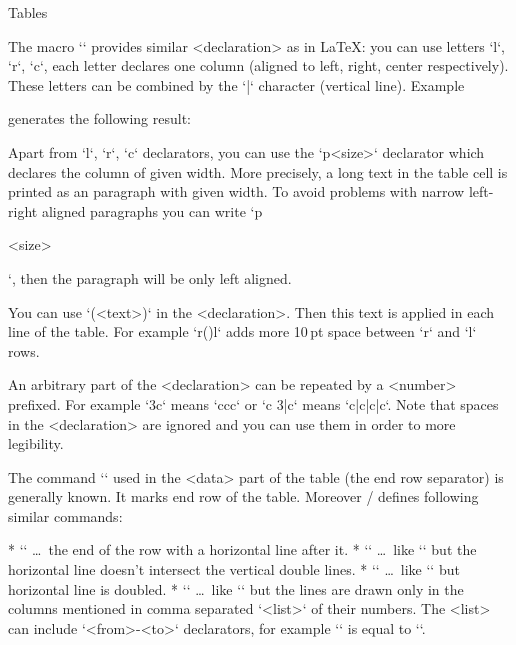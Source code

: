 \secc Tables

The macro `` provides similar <declaration>
as in \LaTeX: you can use letters `l`, `r`, `c`, each letter declares 
one column (aligned to left, right, center respectively). 
These letters can be combined by the `|` character (vertical line). Example

\begtt
{}
\endtt
%
generates the following result:

\bigskip
\hfil{}
\bigskip

Apart from `l`, `r`, `c` declarators, you can use the `p{<size>}` declarator
which declares the column of given width. More precisely, a long text in
the table cell is printed as an paragraph with given width.
To avoid problems with narrow left-right aligned paragraphs you can write
`p{<size>\raggedright}`, then the paragraph will be only left aligned.

You can use `(<text>)` in the <declaration>. Then this text is applied in
each line of the table. For example `r(\kern10pt)l` adds more 10\,pt space
between `r` and `l` rows. 

An arbitrary part of the <declaration> can be repeated by a <number>
prefixed. For example `3c` means `ccc` or `c 3{|c}` means
`c|c|c|c`. Note that spaces in the <declaration> are ignored and you 
can use them in order to more legibility.
 
The command `\cr` used in the <data> part of the table (the end row
separator) is generally known. It marks end row of the table. 
Moreover \OpTeX/ defines following similar commands:

\begitems
* `\crl` \dots\ the end of the row with a horizontal line after it.
* `\crli` \dots\ like `\crl` but the horizontal line doesn't intersect the
      vertical double lines.
* `\crlli` \dots\ like `\crli` but horizontal line is doubled.
* `` \dots\ like `\crli` but the lines are drawn only in the
  columns mentioned in comma separated `<list>` of their numbers.
  The <list> can include `<from>-<to>` declarators, for example
  `` is equal to ``. 
\enditems

